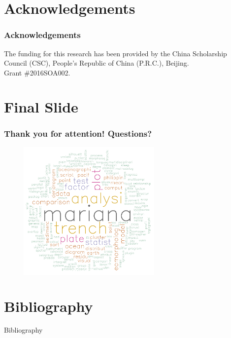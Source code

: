 \documentclass[pdflatex,compress,10pt,
	xcolor={dvipsnames,dvipsnames,svgnames,x11names,table},
	hyperref={colorlinks = true,breaklinks = true, urlcolor = NavyBlue, breaklinks = true}]{beamer}
\begin{document}
\section{Acknowledgements}
\begin{frame}\frametitle{Acknowledgements}
The funding for this research has been provided by the China Scholarship Council (CSC), People’s Republic of China (P.R.C.), Beijing.\\ Grant \#2016SOA002.
\end{frame}

\section{Final Slide}
\begin{frame}\frametitle{Thank you for attention! Questions?}

\begin{figure}[H]
	\centering
		\includegraphics[width=7cm]{Wordcloud.jpg}
\end{figure}		
\end{frame}
 

\section{Bibliography}
\Large{Bibliography}

\scriptsize
\nocite{*}
\printbibliography[heading=none]

\end{document}
